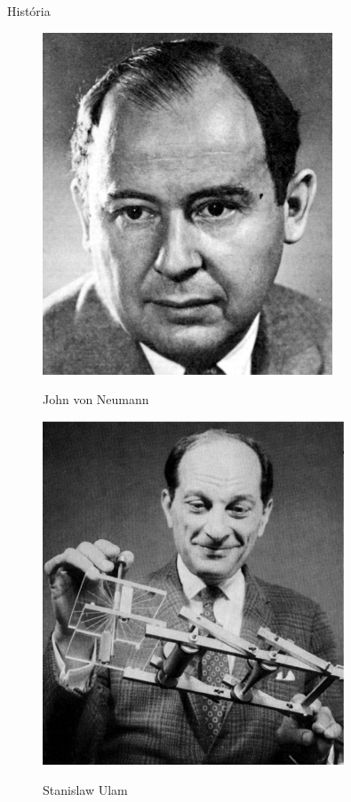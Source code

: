 \documentclass[compress, hide notes]{beamer}
\begin{document}
\begin{frame}{História}

	\center
	\begin{minipage}[t]{0.45\linewidth}\centering
		
		\begin{figure}[!htb]
			\includegraphics[width=0.77\textwidth]{img/neumann.jpg}
			\label{newmann}
			\caption{John von Neumann}
		\end{figure}
			
	\end{minipage}
	\begin{minipage}[t]{0.45\linewidth}\centering
			
		\begin{figure}[!htb]
			\includegraphics[width=0.8\textwidth]{img/ulam.jpg}
			\label{ulam}
			\caption{Stanislaw Ulam}
		\end{figure}
	\end{minipage}
\end{frame}
\end{document}
